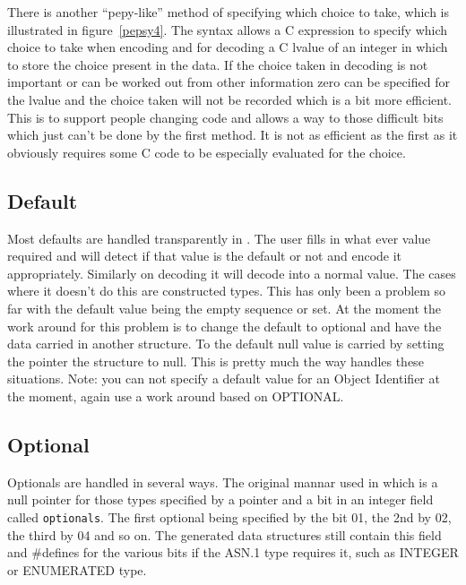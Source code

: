 There is another ``pepy-like'' method of specifying which choice to take,
which is illustrated in figure~\ref{pepsy4}.
The syntax allows a C expression to specify which choice to take when encoding
and for decoding a C lvalue of an integer in
which to store the choice present in the data.
If the choice taken in decoding is not important or can be worked out
from other information zero can be specified for the lvalue and the choice
taken will not be recorded which is a bit more efficient.
This is to support people changing  code and allows a way to
those difficult bits which just can't be done by the first method.
It is not as efficient as the first as it obviously requires some C code to
be especially evaluated for the choice.


\subsection{Default}

Most defaults are handled transparently in .
The user fills in what ever value required and  will
detect if that value is the default or not and encode it appropriately.
Similarly on decoding it will decode into a normal value.
The cases where it doesn't do this are constructed types.
This has only been a problem so far with the default value being the
empty sequence or set.
At the moment the work around for this problem 
is to change the default to optional and have the data
carried in another structure.
To the default null value is carried by setting the pointer the structure
to null.
This is pretty much the way  handles these situations.
Note: you can not specify a default value for an Object Identifier
at the moment, again use a work around based on OPTIONAL.

\subsection{Optional}

Optionals are handled in several ways.
The original mannar used in  which is
a null pointer for those types specified by a pointer and
a bit in an integer field called \verb"optionals".
The first optional being specified by the bit 01, the 2nd by 02,
the third by 04 and so on.
The  generated data structures still contain this field
and \#defines for the various bits if the ASN.1 type requires it,
such as INTEGER or ENUMERATED type.


